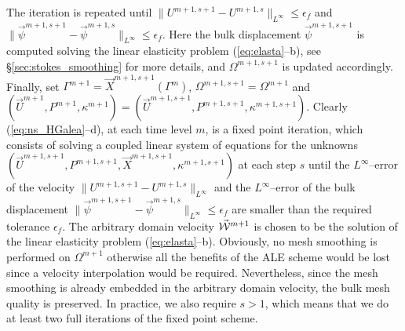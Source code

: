 The iteration is repeated until $\|U^{m+1,s+1}-U^{m+1,s}\|_{L^\infty}
\leq\epsilon_f$ and $\|\vec \psi^{m+1,s+1}-\vec \psi^{m+1,s}\|_{L^\infty}
\leq\epsilon_f$. Here the bulk displacement $\vec \psi^{m+1,s+1}$ is computed
solving the linear elasticity problem (\ref{eq:elasta}--b), see
\S\ref{sec:stokes_smoothing} for more details, and $\Omega^{m+1,s+1}$ is
updated accordingly. Finally, set
${\Gamma^{m+1} = \vec X^{m+1,s+1}(\Gamma^m)}$, $\Omega^{m+1,s+1}=\Omega^{m+1}$
and $(\vec U^{m+1}, P^{m+1}, \kappa^{m+1}) = (\vec U^{m+1,s+1}, P^{m+1,s+1},
\kappa^{m+1,s+1})$. Clearly (\ref{eq:ns_HGalea}--d), at each time level $m$, is
a fixed point iteration, which consists of solving a coupled linear system of
equations for the unknowns $(\vec U^{m+1,s+1}, P^{m+1,s+1}, \vec X^{m+1,s+1},
\kappa^{m+1,s+1})$ at each step $s$ until the $L^\infty$--error of the
velocity $\|U^{m+1,s+1}-U^{m+1,s} \|_{L^\infty}$ and the $L^\infty$--error of
the bulk displacement $\|\vec \psi^{m+1,s+1}-\vec \psi^{m+1,s}\|_{L^\infty}
\leq\epsilon_f$ are smaller than the required tolerance $\epsilon_f$. The
arbitrary domain velocity $\vec{\mathcal W}^{m+1}$ is chosen to be the solution of the linear
elasticity problem (\ref{eq:elasta}--b). Obviously, no mesh smoothing is
performed on $\Omega^{m+1}$ otherwise all the benefits of the ALE scheme would
be lost since a velocity interpolation would be required. Nevertheless, since
the mesh smoothing is already embedded in the arbitrary domain velocity, the
bulk mesh quality is preserved. In practice, we also require $s>1$, which means
that we do at least two full iterations of the fixed point scheme.

